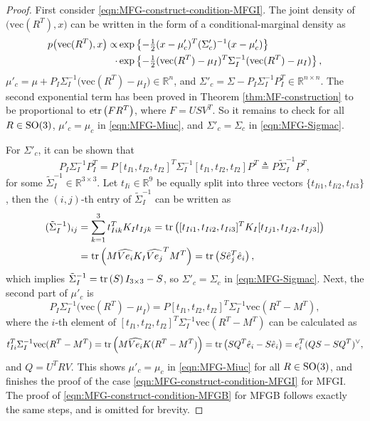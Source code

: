 \begin{proof}
	First consider \eqref{eqn:MFG-construct-condition-MFGI}.
	The joint density of $\big(\mathrm{vec}(R^T),x\big)$ can be written in the form of a conditional-marginal density as
	\begin{align}
		p\big(\mathrm{vec}(R^T),x\big) \propto &\exp\left\{ -\tfrac{1}{2}(x-\mu'_c)^T (\Sigma'_c)^{-1} (x-\mu'_c) \right\} \nonumber \\
		\cdot &\exp\left\{ -\tfrac{1}{2}(\mathrm{vec}(R^T)-{\mu}_I)^T \Sigma_I^{-1} (\mathrm{vec}(R^T)-{\mu}_I) \right\},
	\end{align}
	$\mu'_c = \mu+P_I\Sigma_I^{-1}\big(\mathrm{vec}(R^T)-\mu_I\big) \in \mathbb{R}^n$, and $\Sigma'_c = \Sigma-P_I\Sigma_I^{-1}P_I^T \in \mathbb{R}^{n\times n}$.
	The second exponential term has been proved in Theorem \ref{thm:MF-construction} to be proportional to $\mathrm{etr}\left( FR^T \right)$, where $F=USV^T$.
	So it remains to check for all $R\in\mathrm{SO}(3)$, $\mu'_c = \mu_c$ in \eqref{eqn:MFG-Miuc}, and $\Sigma'_c = \Sigma_c$ in \eqref{eqn:MFG-Sigmac}.
	
	For $\Sigma'_c$, it can be shown that
	\begin{equation*}
		P_I\Sigma_I^{-1}P_I^T = P[t_{I1},t_{I2},t_{I2}]^T\Sigma_I^{-1}[t_{I1},t_{I2},t_{I2}]P^T 
		\triangleq P \tilde{\Sigma}_I^{-1} P^T,
	\end{equation*}
	for some $\tilde{\Sigma}_I^{-1} \in \mathbb{R}^{3\times 3}$.
	Let $t_{Ii}\in\mathbb{R}^9$ be equally split into three vectors $\{t_{Ii1},t_{Ii2},t_{Ii3}\}$, then the $(i,j)$-th entry of $\tilde{\Sigma}_I^{-1}$ can be written as
	\begin{align*}
		(\tilde{\Sigma}_I^{-1})_{ij} &= \sum_{k=1}^3t_{Iik}^T K_I t_{Ijk} = \mathrm{tr}\left( [t_{Ii1},t_{Ii2},t_{Ii3}]^T K_I [t_{Ij1},t_{Ij2},t_{Ij3}] \right) \nonumber \\
		&= \mathrm{tr}\left(  M \widehat{Ve_i} K_I \widehat{Ve_j}^T M^T  \right)
		= \mathrm{tr}\left( S\hat{e}_j^T\hat{e}_i \right),
	\end{align*}
	which implies $\tilde{\Sigma}_I^{-1} = \mathrm{tr}\left( S \right)I_{3 \times 3}-S$, so $\Sigma'_c = \Sigma_c$ in \eqref{eqn:MFG-Sigmac}.
	Next, the second part of $\mu'_c$ is
	\begin{equation*}
		P_I\Sigma_I^{-1}\big(\mathrm{vec}(R^T)-\mu_I\big) = P[t_{I1},t_{I2},t_{I2}]^T\Sigma_I^{-1}\mathrm{vec}(R^T-M^T),
	\end{equation*}
	where the $i$-th element of $[t_{I1},t_{I2},t_{I2}]^T\Sigma_I^{-1}\mathrm{vec}(R^T-M^T)$ can be calculated as
	\begin{gather*}
		t_{Ii}^T\Sigma_I^{-1} \mathrm{vec}(R^T-M^T)
		= \mathrm{tr}\left( M\widehat{Ve_i}K(R^T-M^T) \right) = \mathrm{tr}\left( SQ^T\hat{e}_i - S\hat{e}_i \right) = e_i^T(QS-SQ^T)^\vee, 
	\end{gather*}
	and ${Q} = U^TRV$.
	This shows $\mu'_c = \mu_c$ in \eqref{eqn:MFG-Miuc} for all $R\in\mathrm{SO}(3)$, and finishes the proof of the case \eqref{eqn:MFG-construct-condition-MFGI} for MFGI.
	The proof of \eqref{eqn:MFG-construct-condition-MFGB} for MFGB follows exactly the same steps, and is omitted for brevity.
\end{proof}


